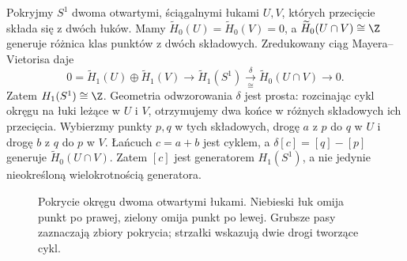 \begin{przyklad}
\label{prz:mv-okrag}
Pokryjmy $S^1$ dwoma otwartymi,
ściągalnymi łukami $U,V$, których
przecięcie składa się z dwóch
łuków. Mamy
$\widetilde H_0(U)=
\widetilde H_0(V)=0$,
a $\widetilde H_0(U\cap V)\cong\Z$
generuje różnica klas punktów
z dwóch składowych.
Zredukowany ciąg
Mayera--Vietorisa daje
\[
 0=\widetilde H_1(U)\oplus
 \widetilde H_1(V)\to
 \widetilde H_1(S^1)
 \xrightarrow[\cong]{\delta}
 \widetilde H_0(U\cap V)\to0.
\]
Zatem $H_1(S^1)\cong\Z$.
Geometria odwzorowania $\delta$ jest prosta:
rozcinając cykl okręgu na łuki
leżące w $U$ i $V$, otrzymujemy
dwa końce w różnych składowych
ich przecięcia.
Wybierzmy punkty $p,q$ w tych składowych, drogę $a$ z $p$ do $q$
w $U$ i drogę $b$ z $q$ do $p$ w $V$.
Łańcuch $c=a+b$ jest cyklem, a
$\delta[c]=[q]-[p]$ generuje $\widetilde H_0(U\cap V)$.
Zatem $[c]$ jest generatorem $H_1(S^1)$, a nie jedynie
nieokreśloną wielokrotnością generatora.
\end{przyklad}

\begin{figure}[!htbp]
\centering
{}
\caption{Pokrycie okręgu dwoma otwartymi łukami. Niebieski łuk
omija punkt po prawej, zielony omija punkt po lewej.
Grubsze pasy zaznaczają zbiory pokrycia; strzałki wskazują
dwie drogi tworzące cykl.}
\label{fig:mv-okrag-8}
\end{figure}

